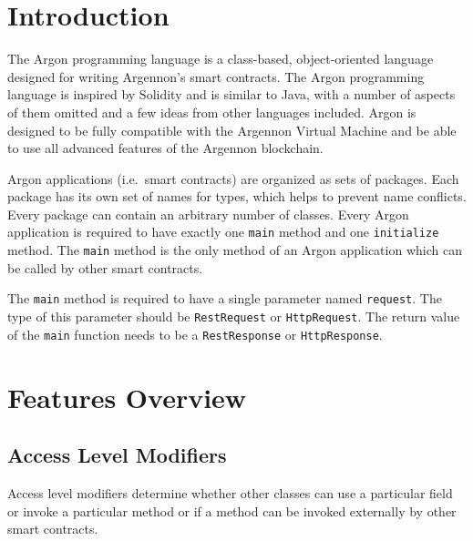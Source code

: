 

\section{Introduction}\label{sec:introduction2}

The Argon programming language is a class-based, object-oriented language designed for writing Argennon's smart
contracts. The Argon programming language is inspired by Solidity and is similar to Java, with a number of aspects
of them omitted and a few ideas from other languages included. Argon is designed to be fully compatible with
the Argennon Virtual Machine and be able to use all advanced features of the Argennon blockchain.

Argon applications (i.e.\ smart contracts) are organized as sets of packages. Each package has its own set of names
for types, which helps to prevent name conflicts. Every package can contain an arbitrary number of classes.
Every Argon application is required
to have exactly one \texttt{main} method and one \texttt{initialize} method. The \texttt{main} method is the
only method of an Argon application which can be called by other smart contracts.

The \texttt{main} method is required to have a single parameter named \texttt{request}. The type of this parameter
should be \texttt{RestRequest} or \texttt{HttpRequest}. The return value of the \texttt{main} function needs to be a
\texttt{RestResponse} or \texttt{HttpResponse}.


\section{Features Overview}\label{sec:features-overview}

\subsection{Access Level Modifiers}\label{subsec:access-level-modifiers}

Access level modifiers determine whether other classes can use a particular field or invoke a particular method or
if a method can be invoked externally by other smart contracts.

